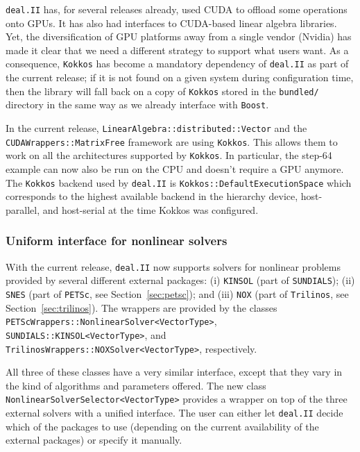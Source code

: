 \documentclass{ansarticle-preprint}
\newcommand{\specialword}[1]{\texttt{#1}}
\newcommand{\dealii}{{\specialword{deal.II}}\xspace}
\newcommand{\trilinos}{{\specialword{Trilinos}}\xspace}
\newcommand{\petsc}{\specialword{PETSc}\xspace}
\newcommand{\snes}{{\specialword{SNES}}\xspace}
\newcommand{\sundials}{{\specialword{SUNDIALS}}\xspace}
\newcommand{\kinsol}{{\specialword{KINSOL}}\xspace}
\newcommand{\boost}{{\specialword{Boost}}\xspace}
\newcommand{\kokkos}{{\specialword{Kokkos}}\xspace}
\begin{document}
\dealii{} has, for several releases already, used CUDA to offload some
operations onto GPUs. It has also had interfaces to CUDA-based linear
algebra libraries. Yet, the diversification of GPU platforms away from
a single vendor (Nvidia) has made it clear that we need a different
strategy to support what users want. As a consequence, \kokkos has
become a mandatory dependency of \dealii{} as part of the current
release; if it is not found on a given system during configuration
time, then the library will fall back on a copy of \kokkos stored in
the \texttt{bundled/} directory in the same way as we already
interface with \boost.

In the current release, \texttt{LinearAlgebra::distributed::Vector} and the 
\texttt{CUDAWrappers::Matrix\allowbreak{}Free} framework are using \kokkos. This allows them 
to work on all the architectures supported by \kokkos. In particular, the step-64 example
can now also be run on the CPU and doesn't require a GPU anymore. \\
The \kokkos backend used by \dealii is \texttt{Kokkos::DefaultExecutionSpace} which corresponds
to the highest available backend in the hierarchy device, host-parallel, and host-serial 
at the time Kokkos was configured.


\subsubsection{Uniform interface for nonlinear solvers}\label{sec:nonlinear}

With the current release, \dealii{} now supports solvers for nonlinear problems
provided by several different external packages:
(i) \kinsol{} (part of \sundials{}); (ii) \snes{} (part of \petsc{}, see Section~\ref{sec:petsc}); and (iii) \texttt{NOX} (part of \trilinos{}, see Section~\ref{sec:trilinos}).
The wrappers are provided by the classes \texttt{PETScWrappers::NonlinearSolver\allowbreak{}<VectorType>}, \texttt{SUNDIALS::KINSOL<VectorType>}, and \texttt{TrilinosWrappers::NOXSolver<Vector\allowbreak{}Type>}, respectively.

All three of these classes have a very similar interface, except that they vary in the kind of
algorithms and parameters offered. The new class \texttt{NonlinearSolverSelector<VectorType>} provides a wrapper on top of
the three external solvers with a unified interface. The user can either let
\dealii{} decide which of the packages to use (depending on the current availability of
the external packages) or specify it manually.
\end{document}
